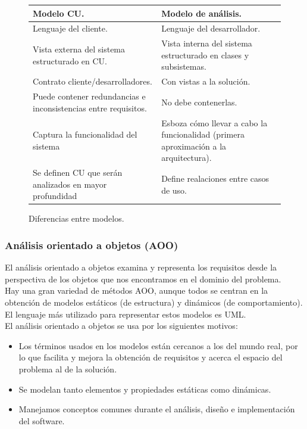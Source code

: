 \documentclass[12pt,spanish]{article}
\begin{document}
\begin{figure}[H]
\centering
\begin{tabular}{|m{7.5cm}|m{7.5cm}|}
\hline
\textbf{Modelo CU}. & \textbf{Modelo de análisis}. \\
\hline
Lenguaje del cliente. & Lenguaje del desarrollador.\\
\hline
Vista externa del sistema estructurado en CU. & Vista interna del sistema estructurado en clases y subsistemas.\\
\hline
Contrato cliente/desarrolladores. & Con vistas a la solución.\\
\hline
Puede contener redundancias e inconsistencias entre requisitos. & No debe contenerlas.\\
\hline
Captura la funcionalidad del sistema & Esboza cómo llevar a cabo la funcionalidad (primera aproximación a la arquitectura).
\\
\hline
Se definen CU que serán analizados en mayor profundidad & Define realaciones entre casos de uso.\\
\hline
\end{tabular}
\caption{Diferencias entre modelos.}
\end{figure}

\subsubsection{Análisis orientado a objetos (AOO)}

El análisis orientado a objetos examina y representa los requisitos desde la perspectiva de los objetos que nos encontramos en el dominio del problema.\\

Hay una gran variedad de métodos AOO, aunque todos se centran en la obtención de modelos estáticos (de estructura) y dinámicos (de comportamiento).\\

El lenguaje más utilizado para representar estos modelos es UML.\\

El análisis orientado a objetos se usa por los siguientes motivos:
 
\begin{itemize}
	\item Los términos usados en los modelos están cercanos a los del mundo real, por lo que facilita y mejora la obtención de requisitos y acerca el espacio del problema al de la solución.
	\item Se modelan tanto elementos y propiedades estáticas como dinámicas.
	\item Manejamos conceptos comunes durante el análisis, diseño e implementación del software.
\end{itemize}
\end{document}
